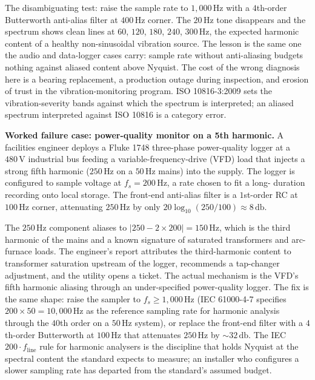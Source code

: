 The disambiguating test: raise the sample rate to $1{,}000 \,\si
{\hertz}$ with a $4$th-order Butterworth anti-alias filter at
$400 \,\si{\hertz}$ corner. The $20 \,\si{\hertz}$ tone disappears
and the spectrum shows clean lines at $60$, $120$, $180$,
$240$, $300 \,\si{\hertz}$, the expected harmonic content of a
healthy non-sinusoidal vibration source. The lesson is the same
one the audio and data-logger cases carry: sample rate without
anti-aliasing budgets nothing against aliased content above
Nyquist. The cost of the wrong diagnosis here is a bearing
replacement, a production outage during inspection, and erosion of
trust in the vibration-monitoring program. ISO 10816-3:2009 sets
the vibration-severity bands against which the spectrum is
interpreted; an aliased spectrum interpreted against ISO 10816 is
a category error.

\textbf{Worked failure case: power-quality monitor on a 5th
harmonic.} A facilities engineer deploys a Fluke 1748 three-phase
power-quality logger at a $480 \,\si{\volt}$ industrial bus
feeding a variable-frequency-drive (VFD) load that injects a
strong fifth harmonic ($250 \,\si{\hertz}$ on a $50 \,\si{\hertz}$
mains) into the supply. The logger is configured to sample voltage
at $f_{s} = 200 \,\si{\hertz}$, a rate chosen to fit a long-
duration recording onto local storage. The front-end anti-alias
filter is a $1$st-order RC at $100 \,\si{\hertz}$ corner,
attenuating $250 \,\si{\hertz}$ by only $20 \log_{10}(250/100)
\approx 8 \,\si{\decibel}$.

The $250 \,\si{\hertz}$ component aliases to
$|250 - 2 \times 200| = 150 \,\si{\hertz}$, which is the third
harmonic of the mains and a known signature of saturated
transformers and arc-furnace loads. The engineer's report
attributes the third-harmonic content to transformer saturation
upstream of the logger, recommends a tap-changer adjustment, and
the utility opens a ticket. The actual mechanism is the VFD's
fifth harmonic aliasing through an under-specified power-quality
logger. The fix is the same shape: raise the sampler to
$f_{s} \geq 1{,}000 \,\si{\hertz}$ (IEC 61000-4-7 specifies
$200 \times 50 = 10{,}000 \,\si{\hertz}$ as the reference sampling
rate for harmonic analysis through the $40$th order on a
$50 \,\si{\hertz}$ system), or replace the front-end filter with a
$4$th-order Butterworth at $100 \,\si{\hertz}$ that attenuates
$250 \,\si{\hertz}$ by $\sim 32 \,\si{\decibel}$. The IEC
$200 \cdot f_{\text{line}}$ rule for harmonic analysers is the
discipline that holds Nyquist at the spectral content the standard
expects to measure; an installer who configures a slower sampling
rate has departed from the standard's assumed budget.

